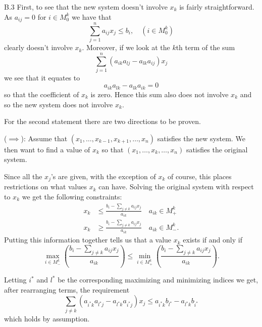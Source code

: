 \documentclass[a4paper]{article}
\begin{document}
  \begin{exercise}{B.3}
    First, to see that the new system doesn't involve $ x_k $ is fairly straightforward. As $ a_{ij} = 0 $ for $ i \in M_0^{k} $ we have that
    \begin{equation*}
    \sum_{j=1}^{n} a_{ij}x_j \leq b_i, \quad (i \in M_0^{k})
    \end{equation*}
    clearly doesn't involve $ x_k $. Moreover, if we look at the $ k $th term of the sum
    \begin{equation*}
    \sum_{j = 1}^{n} (a_{ik}a_{lj} - a_{lk}a_{ij}) x_j
    \end{equation*}
    we see that it equates to
    \begin{equation*}
    a_{ik}a_{lk} - a_{lk}a_{ik} = 0
    \end{equation*}
    so that the coefficient of $ x_k $ is zero. Hence this sum also does not involve $ x_k $ and so the new system does not involve $ x_k $.

    For the second statement there are two directions to be proven.

    ($ \implies $): Assume that $ (x_1, \ldots, x_{k-1}, x_{k+1}, \ldots, x_n) $ satisfies the new system. We then want to find a value of $ x_k $ so that $ (x_1, \ldots, x_k, \ldots, x_n) $ satisfies the original system.

    Since all the $ x_j $'s are given, with the exception of $ x_k $ of course, this places restrictions on what values $ x_k $ can have. Solving the original system with respect to $ x_k $ we get the following constraints:
    \begin{align*}
      x_k & \leq \frac{b_i - \sum_{j \neq k} a_{ij}x_j}{a_{ik}}\quad a_{ik} \in M_+^{k} \\
      x_k & \geq \frac{b_i - \sum_{j \neq k} a_{ij}x_j}{a_{ik}}\quad a_{ik} \in M_-^{k}
    .\end{align*}
    Putting this information together tells us that a value $ x_k $ exists if and only if
    \begin{equation*}
    \max_{i \in M_-^{k}} \left( \frac{b_i - \sum_{j \neq k} a_{ij}x_j}{a_{ik}} \right) \leq \min_{i \in M_+^{k}} \left( \frac{b_i - \sum_{j \neq k} a_{ij}x_j}{a_{ik}} \right)
    .\end{equation*}

    Letting $ i^{*} $ and $ l^{*} $ be the corresponding maximizing and minimizing indices we get, after rearranging terms, the requirement
    \begin{equation*}
      \sum_{j \neq k }(a_{i^{*}k}a_{l^{*}j} - a_{l^{*}k}a_{i^{*}j})x_j \leq a_{i^{*}k} b_{l^{*}} - a_{l^{*}k}b_{i^{*}}
    \end{equation*}
    which holds by assumption.


\end{exercise}
\end{document}
